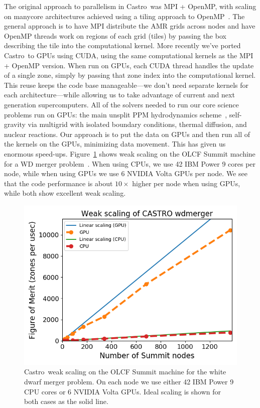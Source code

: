 \documentclass[a4paper]{jpconf}
\newcommand{\castro}{{\sffamily Castro}}
\begin{document}
The original approach to parallelism in \castro\ was MPI + OpenMP,
with scaling on manycore architectures achieved using a tiling approach
to OpenMP~\cite{tiling,astronum:2017}.  The general approach is to
have MPI distribute the AMR grids across nodes and have OpenMP threads
work on regions of each grid (tiles) by passing the box describing the
tile into the computational kernel.  More recently we've ported
\castro\ to GPUs using CUDA, using the same computational kernels as
the MPI + OpenMP version.  When run on GPUs, each CUDA thread handles
the update of a single zone, simply by passing that zone index into
the computational kernel.  This reuse keeps the code base
manageable---we don't need separate kernels for each
architecture---while allowing us to take advantage of current and next
generation supercomputers.  All of the solvers needed to run our core
science problems run on GPUs: the main unsplit PPM hydrodynamics
scheme~\cite{ppm,millercolella:2002}, self-gravity via multigrid with
isolated boundary conditions, thermal diffusion, and nuclear
reactions.  Our approach is to put the data on GPUs and then run all
of the kernels on the GPUs, minimizing data movement.  This has given
us enormous speed-ups.  Figure~\ref{fig:gpu} shows weak scaling on the
OLCF Summit machine for a WD merger problem~\cite{wdmergerI}.  When
using CPUs, we use 42 IBM Power 9 cores per node, while when using
GPUs we use 6 NVIDIA Volta GPUs per node.  We see that the code
performance is about $10\times$ higher per node when using GPUs, while
both show excellent weak scaling.

\begin{figure}[t]
\centering
\includegraphics[width=0.8\linewidth]{wdmerger_gpu}
\caption{\label{fig:gpu} \castro\ weak scaling on the OLCF Summit
  machine for the white dwarf merger problem.  On each node we use
  either 42 IBM Power 9 CPU cores or 6 NVIDIA Volta GPUs.  Ideal
  scaling is shown for both cases as the solid line.}
\end{figure}
\end{document}
